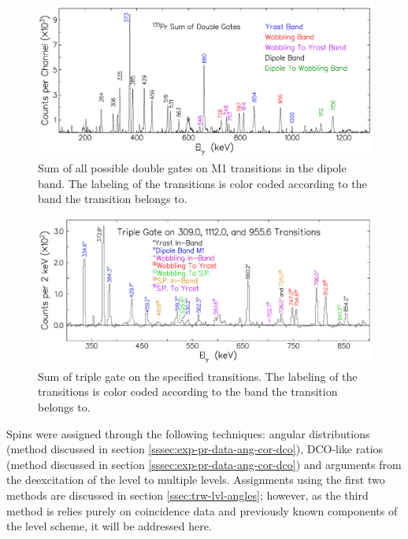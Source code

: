 \begin{figure}[h!]
\centerline{\includegraphics[width=\textwidth]{./img/c4/sum_of_dbl_gate_ev.pdf}}
	\caption{Sum of all possible double gates on M1 transitions in the dipole band. The labeling of the transitions is color coded according to the band the transition belongs to. \label{fig:chp4-spec-dbl-gates}}
\end{figure}
\begin{figure}[h!]
\centerline{\includegraphics[width=\textwidth]{./img/c4/trip_gate_ev.pdf}}
	\caption{Sum of triple gate on the specified transitions. The labeling of the transitions is color coded according to the band the transition belongs to. \label{fig:chp4-spec-triple-gate}}
\end{figure}

Spins were assigned through the following techniques: angular distributions (method discussed in section \ref{sssec:exp-pr-data-ang-cor-dco}), DCO-like ratios (method discussed in section \ref{sssec:exp-pr-data-ang-cor-dco}) and arguments from the deexcitation of the level to multiple levels. Assignments using the first two methods are discussed in section \ref{ssec:trw-lvl-angles}; however, as the third method is relies purely on coincidence data and previously known components of the level scheme, it will be addressed here.

